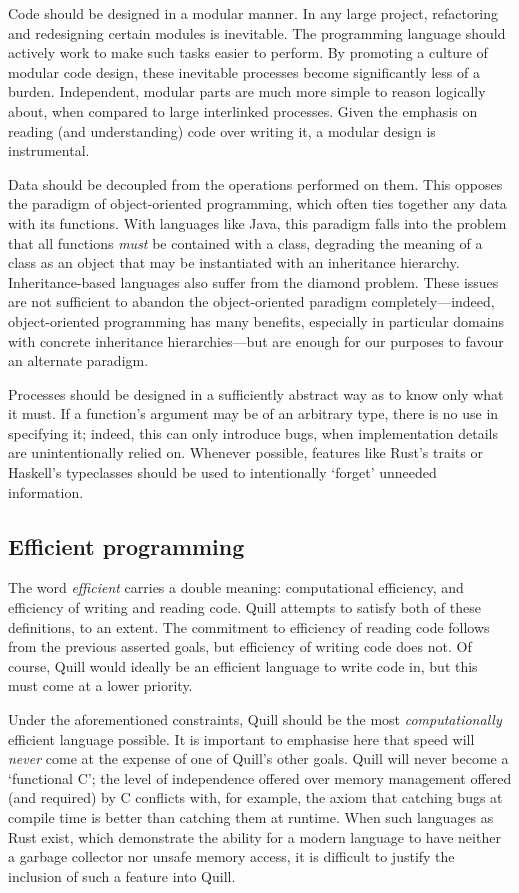 \documentclass[11pt]{book}
\begin{document}
Code should be designed in a modular manner.
In any large project, refactoring and redesigning certain modules is inevitable.
The programming language should actively work to make such tasks easier to perform.
By promoting a culture of modular code design, these inevitable processes become significantly less of a burden.
Independent, modular parts are much more simple to reason logically about, when compared to large interlinked processes.
Given the emphasis on reading (and understanding) code over writing it, a modular design is instrumental.

Data should be decoupled from the operations performed on them.
This opposes the paradigm of object-oriented programming, which often ties together any data with its functions.
With languages like Java, this paradigm falls into the problem that all functions \textit{must} be contained with a class, degrading the meaning of a class as an object that may be instantiated with an inheritance hierarchy.
Inheritance-based languages also suffer from the diamond problem.
These issues are not sufficient to abandon the object-oriented paradigm completely---indeed, object-oriented programming has many benefits, especially in particular domains with concrete inheritance hierarchies---but are enough for our purposes to favour an alternate paradigm.

Processes should be designed in a sufficiently abstract way as to know only what it must.
If a function's argument may be of an arbitrary type, there is no use in specifying it; indeed, this can only introduce bugs, when implementation details are unintentionally relied on.
Whenever possible, features like Rust's traits or Haskell's typeclasses should be used to intentionally `forget' unneeded information.

\subsection{Efficient programming}

The word \textit{efficient} carries a double meaning: computational efficiency, and efficiency of writing and reading code.
Quill attempts to satisfy both of these definitions, to an extent.
The commitment to efficiency of reading code follows from the previous asserted goals, but efficiency of writing code does not.
Of course, Quill would ideally be an efficient language to write code in, but this must come at a lower priority.

Under the aforementioned constraints, Quill should be the most \textit{computationally} efficient language possible.
It is important to emphasise here that speed will \textit{never} come at the expense of one of Quill's other goals.
Quill will never become a `functional C'; the level of independence offered over memory management offered (and required) by C conflicts with, for example, the axiom that catching bugs at compile time is better than catching them at runtime.
When such languages as Rust exist, which demonstrate the ability for a modern language to have neither a garbage collector nor unsafe memory access, it is difficult to justify the inclusion of such a feature into Quill.
\end{document}

